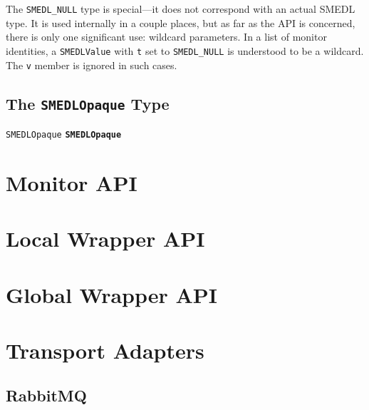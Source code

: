 \documentclass[paper=letter,titlepage,captions=tableheading]{scrartcl}
\begin{document}
The \texttt{SMEDL\_NULL} type is special---it does not correspond with an
actual SMEDL type. It is used internally in a couple places, but as far as the
API is concerned, there is only one significant use: wildcard parameters. In a
list of monitor identities, a \texttt{SMEDLValue} with \texttt{t} set to
\texttt{SMEDL\_NULL} is understood to be a wildcard. The \texttt{v} member is
ignored in such cases.

\subsection{The \texttt{SMEDLOpaque} Type}
\label{subsec:smedlopaque}

\texttt{SMEDLOpaque} \texttt{\bfseries SMEDLOpaque}



\section{Monitor API}
\label{sec:mon}


\section{Local Wrapper API}
\label{sec:local}


\section{Global Wrapper API}
\label{sec:global}


\section{Transport Adapters}
\label{sec:transport}


\subsection{RabbitMQ}
\label{subsec:rabbitmq}


\end{document}
